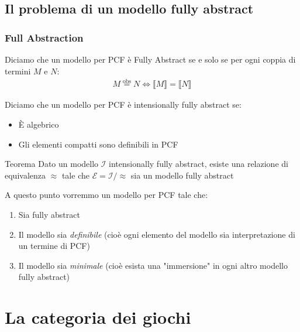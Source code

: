 \documentclass{beamer}
\newcommand{\eqobs}{\stackrel{\text{obs}}{=}}
\begin{document}
\subsection{Il problema di un modello fully abstract}
\begin{frame}
	
	\frametitle{Full Abstraction}
	
	\begin{block}{}
	Diciamo che un modello per PCF è Fully Abstract se e solo se per ogni coppia di termini $M$ e $N$:
	\begin{gather*}
		M \eqobs N \Leftrightarrow \llbracket M \rrbracket = \llbracket N \rrbracket
	\end{gather*}
	\end{block}
	
	\begin{block}{}
	Diciamo che un modello per PCF è intensionally fully abstract se:
	\begin{itemize}
		\item È algebrico
		\item Gli elementi compatti sono definibili in PCF
	\end{itemize}
	\end{block}
	
	\begin{block}{Teorema}
		Dato un modello $\mathcal{I}$ intensionally fully abstract, esiste una relazione di equivalenza $\approx$ tale che $\mathcal{E}=\mathcal{I}/ \approx$ sia un modello fully abstract
	\end{block}
	

\end{frame}



\begin{frame}

	A questo punto vorremmo un modello per PCF tale che:
	\begin{enumerate}
		\item Sia fully abstract
		\item Il modello sia \emph{definibile} (cioè ogni elemento del modello sia interpretazione di un termine di PCF)
		\item Il modello sia \emph{minimale} (cioè esista una "immersione" in ogni altro modello fully abstract)
	\end{enumerate}
	
\end{frame}


\section{La categoria dei giochi}
\end{document}
